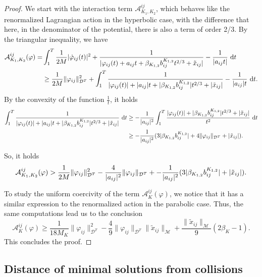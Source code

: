 \documentclass[a4paper,10pt]{amsart}
\newcommand{\ud}{\mathrm{d}}
\theoremstyle{plain}
\theoremstyle{definition}
\numberwithin{equation}{section}
\numberwithin{thm}{section}
\begin{document}
\begin{proof}
We start with the interaction term $\mathcal{A}_{K_1,K_2}^{ij}$, which behaves like the renormalized Lagrangian action in the hyperbolic case, with the difference that here, in the denominator of the potential, there is also a term of order 2/3. By the triangular inequality, we have
\[
\begin{split}
    \mathcal{A}_{K_1,K_2}^{ij}(\varphi) = &\int_{1}^{T}\frac{1}{2M} |\dot{\varphi}_{ij}(t)|^2+ \frac{1}{|\varphi_{ij}(t)+a_{ij}t+\beta_{K_{1,2}}b_{ij}^{K_{1,2}}t^{2/3}+\Tilde{x}_{ij}|} - \frac{1}{|a_{ij}t|}\ \ud t\\
    &\geq \frac{1}{2M} \|\varphi_{ij}\|_{\mathcal{D}^T}^2 + \int_{1}^{T} \frac{1}{|\varphi_{ij}(t)|+|a_{ij}|t+|\beta_{K_{1,2}}b_{ij}^{K_{1,2}}|t^{2/3}+|\Tilde{x}_{ij}|} - \frac{1}{|a_{ij}|t}\ \ud t.
\end{split}
\]
By the convexity of the function $\frac{1}{t}$, it holds
\[
\begin{split}
    \int_{1}^{T} \frac{1}{|\varphi_{ij}(t)|+|a_{ij}|t+|\beta_{K_{1,2}}b_{ij}^{K_{1,2}}|t^{2/3}+|\Tilde{x}_{ij}|}\ \ud t &\geq -\frac{1}{|a_{ij}|^2}\int_{1}^{T} \frac{|\varphi_{ij}(t)|+|\beta_{K_{1,2}}b_{ij}^{K_{1,2}}|t^{2/3}+|\Tilde{x}_{ij}|}{t^2}\ \ud t \\
    &\ge-\frac{1}{|a_{ij}|^2}(3|\beta_{K_{1,2}}b_{ij}^{K_{1,2}}| + 4\|\varphi_{ij}\|_{\mathcal{D}^T}+|\Tilde{x}_{ij}|).
\end{split}
\]


So, it holds
\[
\mathcal{A}_{K_1,K_2}^{ij}(\varphi) > \frac{1}{2M}\|\varphi_{ij}\|_{\mathcal{D}^T}^2 - \frac{4}{|a_{ij}|^2} \|\varphi_{ij}\|_{\mathcal{D}^T} + -\frac{1}{|a_{ij}|^2}(3|\beta_{K_{1,2}}b_{ij}^{K_{1,2}}| + |\Tilde{x}_{ij}|).
\]

To study the uniform coercivity of the term $\mathcal{A}_{K}^{ij}(\varphi)$, we notice that it has a similar expression to the renormalized action in the parabolic case. Thus, the same computations lead us to the conclusion 
\[
    \mathcal{A}_{K}^{ij}(\varphi) \geq \frac{1}{18 M_K}\|\varphi_{ij}\|_{\mathcal{D}^T}^2 - \frac{4}{9}\|\varphi_{ij}\|_{\mathcal{D}^T}\|\tilde x_{ij}\|_\mathcal{M} + \frac{\|\tilde x_{ij}\|_\mathcal{M}}{9}(2\beta_K-1).
\]
This concludes the proof.

\end{proof}

\subsection{Distance of minimal solutions from collisions}\label{sec:collisionless_minimal_solutions}
\end{document}
